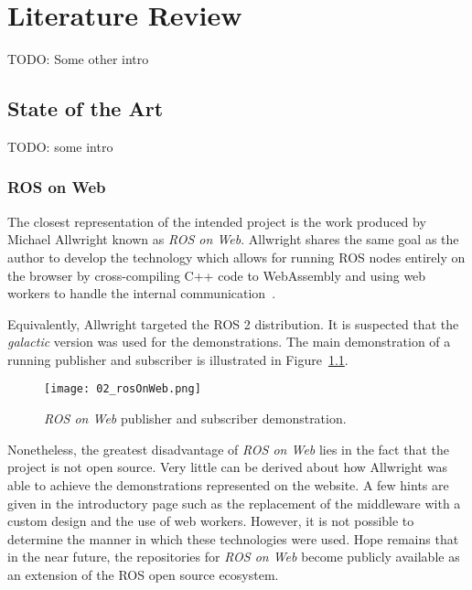 \chapter{Literature Review}\label{cha:literature}

    TODO: Some other intro

\section{State of the Art}

    TODO: some intro

    \subsection{ROS on Web}

        The closest representation of the intended project is the work produced by Michael Allwright known as \textit{ROS on Web}. Allwright shares the same goal as the author to develop the technology which allows for running ROS nodes entirely on the browser by cross-compiling C++ code to WebAssembly and using web workers to handle the internal communication~\cite{rosonweb}.

        Equivalently, Allwright targeted the \ac{ROS} 2 distribution. It is suspected that the \textit{galactic} version was used for the demonstrations. The main demonstration of a running publisher and subscriber is illustrated in Figure~\ref{fig:rosonweb}.
        
        
        \begin{figure}[htbp]
            \centering
            \texttt{[image: 02\_rosOnWeb.png]}
            \caption{\textit{ROS on Web} publisher and subscriber demonstration.}
            \label{fig:rosonweb}
        \end{figure}

        Nonetheless, the greatest disadvantage of \textit{ROS on Web} lies in the fact that the project is not open source. Very little can be derived about how Allwright was able to achieve the demonstrations represented on the website. A few hints are given in the introductory page such as the replacement of the middleware with a custom design and the use of web workers. However, it is not possible to determine the manner in which these technologies were used. Hope remains that in the near future, the repositories for \textit{ROS on Web} become publicly available as an extension of the ROS open source ecosystem.

